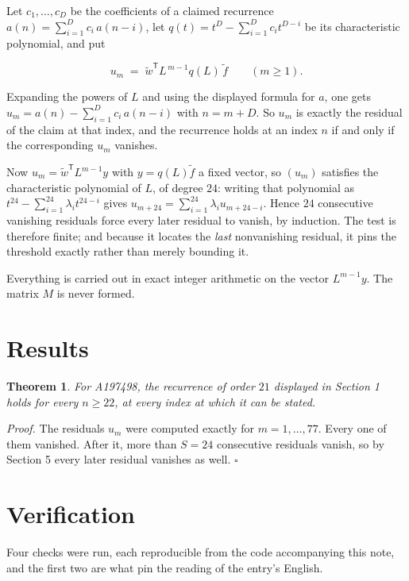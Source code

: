 \documentclass[11pt]{article}
\newtheorem{theorem}{Theorem}
\theoremstyle{definition}
\begin{document}
Let $c_1,\dots,c_D$ be the coefficients of a claimed recurrence $a(n) = \sum_{i=1}^{D} c_i\,a(n-i)$, let $q(t) = t^{D} - \sum_{i=1}^{D} c_i t^{D-i}$ be its characteristic polynomial, and put

\[u_m \;=\; \tilde w^{\mathsf T} L^{\,m-1} q(L)\,\tilde f \qquad (m \ge 1).\]

Expanding the powers of $L$ and using the displayed formula for $a$, one gets $u_m = a(n) - \sum_{i=1}^{D} c_i\,a(n-i)$ with $n = m + D$. So $u_m$ is exactly the residual of the claim at that index, and the recurrence holds at an index $n$ if and only if the corresponding $u_m$ vanishes.

Now $u_m = \tilde w^{\mathsf T} L^{m-1} y$ with $y = q(L)\tilde f$ a fixed vector, so $(u_m)$ satisfies the characteristic polynomial of $L$, of degree $24$: writing that polynomial as $t^{24} - \sum_{i=1}^{24} \lambda_i t^{24-i}$ gives $u_{m+24} = \sum_{i=1}^{24} \lambda_i u_{m+24-i}$. Hence $24$ consecutive vanishing residuals force every later residual to vanish, by induction. The test is therefore finite; and because it locates the {\itshape last} nonvanishing residual, it pins the threshold exactly rather than merely bounding it.

Everything is carried out in exact integer arithmetic on the vector $L^{m-1}y$. The matrix $M$ is never formed.

\section{Results}

\begin{theorem} For A197498, the recurrence of order $21$ displayed in Section 1 holds for every $n \ge 22$, at every index at which it can be stated.\end{theorem}

{\itshape Proof.} The residuals $u_m$ were computed exactly for $m = 1,\dots,77$. Every one of them vanished. After it, more than $S = 24$ consecutive residuals vanish, so by Section 5 every later residual vanishes as well. $\square$

\section{Verification}

Four checks were run, each reproducible from the code accompanying this note, and the first two are what pin the reading of the entry's English.
\end{document}
